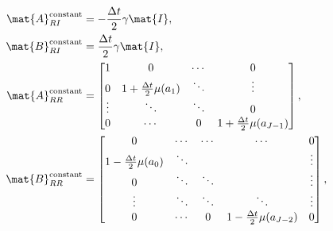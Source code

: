 \documentclass{jpmarticle}
\begin{document}
\begin{equation}
  \begin{split}
    \mat{A}_{RI}^{\text{constant}} &=
    - \frac{\Delta t}{2} \gamma \mat{I},
    \\
    \mat{B}_{RI}^{\text{constant}} &=
    \frac{\Delta t}{2} \gamma \mat{I},
    \\
    \mat{A}_{RR}^{\text{constant}} &=
    \begin{bmatrix}
      1 & 0 & \cdots & 0
      \\
      0 & 1 + \frac{\Delta t}{2} \mu(a_1) &
      \ddots & \vdots
      \\
      \vdots & \ddots & \ddots & 0
      \\
      0 & \cdots & 0 &
      1 + \frac{\Delta t}{2} \mu(a_{J - 1})
    \end{bmatrix},
    \\
    \mat{B}_{RR}^{\text{constant}} &=
    \begin{bmatrix}
      0 & \cdots & \cdots & \cdots & 0
      \\
      1 - \frac{\Delta t}{2} \mu(a_0) & \ddots &
      & & \vdots
      \\
      0 & \ddots & \ddots & & \vdots
      \\
      \vdots & \ddots & \ddots & \ddots & \vdots
      \\
      0 & \cdots & 0 &
      1 - \frac{\Delta t}{2} \mu(a_{J - 2}) & 0
    \end{bmatrix},
  \end{split}
\end{equation}
\end{document}
